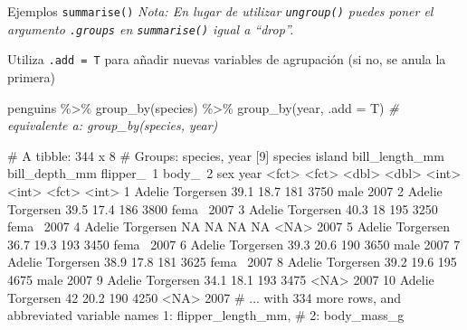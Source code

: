 \documentclass[
  ignorenonframetext,
  aspectratio=169]{beamer}
\newenvironment{Shaded}{\begin{snugshade}}{\end{snugshade}}
\newcommand{\AttributeTok}[1]{\textcolor[rgb]{0.77,0.63,0.00}{#1}}
\newcommand{\CommentTok}[1]{\textcolor[rgb]{0.56,0.35,0.01}{\textit{#1}}}
\newcommand{\FunctionTok}[1]{\textcolor[rgb]{0.00,0.00,0.00}{#1}}
\newcommand{\NormalTok}[1]{#1}
\newcommand{\SpecialCharTok}[1]{\textcolor[rgb]{0.00,0.00,0.00}{#1}}
\let\oldverbatim\verbatim
\let\endoldverbatim\endverbatim
\renewenvironment{verbatim}{\tiny\oldverbatim}{\endoldverbatim}
\begin{document}
\begin{frame}[fragile]{Ejemplos \texttt{summarise()}}
\protect\hypertarget{ejemplos-summarise-2}{}
\emph{Nota: En lugar de utilizar \texttt{ungroup()} puedes poner el
argumento \texttt{.groups} en \texttt{summarise()} igual a ``drop''.}

Utiliza \texttt{.add\ =\ T} para añadir nuevas variables de agrupación
(si no, se anula la primera)

\begin{Shaded}
\begin{Highlighting}[]
\NormalTok{penguins }\SpecialCharTok{\%\textgreater{}\%} 
  \FunctionTok{group\_by}\NormalTok{(species) }\SpecialCharTok{\%\textgreater{}\%} 
  \FunctionTok{group\_by}\NormalTok{(year, }\AttributeTok{.add =}\NormalTok{ T)   }\CommentTok{\# equivalente a: group\_by(species, year)}
\end{Highlighting}
\end{Shaded}

\begin{verbatim}
# A tibble: 344 x 8
# Groups:   species, year [9]
   species island    bill_length_mm bill_depth_mm flipper_~1 body_~2 sex    year
   <fct>   <fct>              <dbl>         <dbl>      <int>   <int> <fct> <int>
 1 Adelie  Torgersen           39.1          18.7        181    3750 male   2007
 2 Adelie  Torgersen           39.5          17.4        186    3800 fema~  2007
 3 Adelie  Torgersen           40.3          18          195    3250 fema~  2007
 4 Adelie  Torgersen           NA            NA           NA      NA <NA>   2007
 5 Adelie  Torgersen           36.7          19.3        193    3450 fema~  2007
 6 Adelie  Torgersen           39.3          20.6        190    3650 male   2007
 7 Adelie  Torgersen           38.9          17.8        181    3625 fema~  2007
 8 Adelie  Torgersen           39.2          19.6        195    4675 male   2007
 9 Adelie  Torgersen           34.1          18.1        193    3475 <NA>   2007
10 Adelie  Torgersen           42            20.2        190    4250 <NA>   2007
# ... with 334 more rows, and abbreviated variable names 1: flipper_length_mm,
#   2: body_mass_g
\end{verbatim}
\end{frame}
\end{document}
